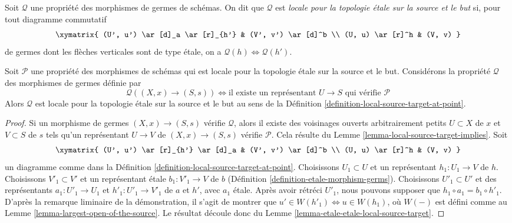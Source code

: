 \begin{definition}
\label{definition-local-source-target-at-point}
Soit $\mathcal{Q}$ une propriété des morphismes de germes de schémas.
On dit que $\mathcal{Q}$ est {\it locale pour la topologie \'etale sur la
source et le but} si, pour tout diagramme commutatif
$$
\xymatrix{
(U', u') \ar[d]_a \ar[r]_{h'} & (V', v') \ar[d]^b \\
(U, u) \ar[r]^h & (V, v)
}
$$
de germes dont les flèches verticales sont de type \'etale, on a
$\mathcal{Q}(h) \Leftrightarrow \mathcal{Q}(h')$.
\end{definition}

\begin{lemma}
\label{lemma-local-source-target-global-implies-local}
Soit $\mathcal{P}$ une propriété des morphismes de schémas
qui est locale pour la topologie \'etale sur la source et le but.
Considérons la propriété $\mathcal{Q}$ des morphismes de germes définie par
$$
\mathcal{Q}((X, x) \to (S, s))
\Leftrightarrow
\text{il existe un représentant }U \to S
\text{ qui vérifie }\mathcal{P}
$$
Alors $\mathcal{Q}$ est locale pour la topologie \'etale sur la source et
le but au sens de la
Définition \ref{definition-local-source-target-at-point}.
\end{lemma}

\begin{proof}
Si un morphisme de germes $(X, x) \to (S, s)$ vérifie $\mathcal{Q}$,
alors il existe des voisinages ouverts arbitrairement petits
$U \subset X$ de $x$ et $V \subset S$ de $s$ tels qu'un représentant
$U \to V$ de $(X, x) \to (S, s)$ vérifie $\mathcal{P}$.
Cela résulte du Lemme \ref{lemma-local-source-target-implies}. Soit
$$
\xymatrix{
(U', u') \ar[r]_{h'} \ar[d]_a & (V', v') \ar[d]^b \\
(U, u) \ar[r]^h & (V, v)
}
$$
un diagramme comme dans la
Définition \ref{definition-local-source-target-at-point}.
Choisissons $U_1 \subset U$ et un représentant $h_1 : U_1 \to V$ de $h$.
Choisissons $V'_1 \subset V'$ et un représentant \'etale
$b_1 : V'_1 \to V$ de $b$
(Définition \ref{definition-etale-morphism-germs}).
Choisissons $U'_1 \subset U'$ et des représentants
$a_1 : U'_1 \to U_1$ et $h'_1 : U'_1 \to V'_1$ de $a$ et $h'$,
avec $a_1$ \'etale. Après avoir rétréci $U'_1$, nous pouvons supposer que
$h_1 \circ a_1 = b_1 \circ h'_1$. D'après la remarque liminaire de la
démonstration, il s'agit de montrer que
$u' \in W(h'_1) \Leftrightarrow u \in W(h_1)$, où $W(-)$ est défini comme
au Lemme \ref{lemma-largest-open-of-the-source}.
Le résultat découle donc du
Lemme \ref{lemma-etale-etale-local-source-target}.
\end{proof}

